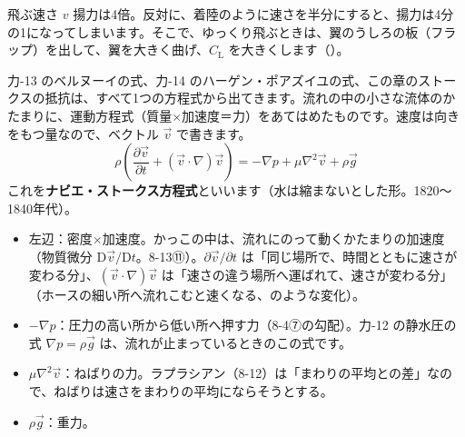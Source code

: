 \begin{bkcenter}
\end{bkcenter}

\begin{phbaisuru}{飛ぶ速さ $v$}
揚力は4倍。反対に、着陸のように速さを半分にすると、揚力は4分の1になってしまいます。そこで、ゆっくり飛ぶときは、翼のうしろの板（フラップ）を出して、翼を大きく曲げ、$C_{\mathrm L}$ を大きくします（\nobreak{}\nobreak）。
\end{phbaisuru}

\label{ph:力-15:sec10}力-13 のベルヌーイの式、力-14 のハーゲン・ポアズイユの式、この章のストークスの抵抗は、すべて1つの方程式から出てきます。流れの中の小さな流体のかたまりに、運動方程式（質量×加速度＝力）をあてはめたものです。速度は向きをもつ量なので、ベクトル $\vec{v}$ で書きます。
\[\rho\left(\frac{\partial\vec{v}}{\partial t}+(\vec{v}\cdot\nabla)\vec{v}\right)=-\nabla p+\mu\nabla^2\vec{v}+\rho\vec{g}\]
これを\textbf{ナビエ・ストークス方程式}といいます（水は縮まないとした形。1820〜1840年代）。

\begin{phyomi}
\begin{itemize}[leftmargin=1.2\zw, itemsep=1pt, topsep=1pt, label={\color{phYomi}●}]
\item 左辺：密度×加速度。かっこの中は、流れにのって動くかたまりの加速度（物質微分 $\mathrm{D}\vec{v}/\mathrm{D}t$。8-13⑪）。$\partial\vec{v}/\partial t$ は「同じ場所で、時間とともに速さが変わる分」、$(\vec{v}\cdot\nabla)\vec{v}$ は「速さの違う場所へ運ばれて、速さが変わる分」（ホースの細い所へ流れこむと速くなる、のような変化）。
\item $-\nabla p$：圧力の高い所から低い所へ押す力（8-4⑦の勾配）。力-12 の静水圧の式 $\nabla p=\rho\vec{g}$ は、流れが止まっているときのこの式です。
\item $\mu\nabla^2\vec{v}$：ねばりの力。ラプラシアン（8-12）は「まわりの平均との差」なので、ねばりは速さをまわりの平均にならそうとする。
\item $\rho\vec{g}$：重力。
\end{itemize}
\end{phyomi}

